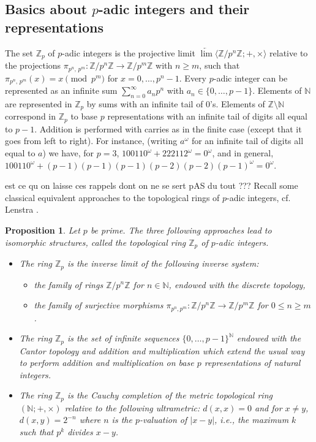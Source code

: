 \documentclass[11pt,a4paper]{article}
\newtheorem{proposition}[theorem]{Proposition}
\theoremstyle{definition} %
\newcommand\+[1]{\mathcal{#1}} %
\newcommand{\N}{{\mathbb N}}     %
\newcommand{\Z}{{\mathbb Z}}     %
\newcommand{\pat}{\color{red}}
\begin{document}
\subsection{ Basics about $p$-adic integers and their representations}\label{ss p-adicBasics}
The set $\Z_p$ of $p$-adic integers  is the projective limit 
${\underleftarrow{\lim}} \langle\Z/p^n\Z;+,\times\rangle$
relative to the projections $\pi_{p^n\!,\,p^m}\colon \Z/p^n\Z\to\Z/p^m\Z$ 
 with $n\geq m$, such that $\pi_{p^n\!,\,p^m}(x)=x\pmod {p^m}$ for 
$x=0,\ldots,p^n-1$. 
 Every $p$-adic integer  can be represented as an infinite sum
 $\sum_{n=0}^\infty a_n p^n$ with $a_n\in\{0,\ldots,p-1\}$. 
 Elements of $\N$ are represented in $\Z_p$ 
 by sums with an infinite tail of $0$'s.
Elements of $\Z\setminus\N$ correspond in $\Z_p$ to  base $p$
representations with an infinite tail of digits all equal to $p-1$.
 Addition is performed with carries as in the finite case (except that it goes from left to right).
 For instance, (writing $a^\omega$ for an infinite tail of digits all equal to $a$)
we have, for $p=3$,  $100110^\omega + 222112^\omega=0^\omega$, and in general, $100110^\omega + (p-1)(p-1)(p-1)(p-2)(p-2)(p-1)^\omega=0^\omega$.

{\pat est ce qu on laisse ces rappels dont on ne se sert pAS du tout ???
Recall some classical equivalent approaches to
the topological rings of $p$-adic integers,
cf.\! Lenstra \cite{lenstra2}. %
%

\begin{proposition}\label{p:Zp}
Let $p$ be prime.
The three following approaches lead to isomorphic structures,
called the topological ring $\Z_p$ of $p$-adic integers.
\begin{itemize}
\item
The ring $\Z_p$ is the inverse limit of the following inverse system:
\itemsep0pt\begin{itemize}
\item
the family of rings $\Z/p^n\Z$ for $n\in\N$,
endowed with the discrete topology,
\item
the family of surjective morphisms
$\pi_{p^n,p^m}:\Z/p^n\Z \to \Z/p^m\Z$ for $0{\leq} n\geq m$.
\end{itemize}
\item
The ring $\Z_p$ is the set of infinite sequences $\{0,\ldots,p-1\}^\N$
endowed with the Cantor topology and addition and multiplication
which extend the usual way to perform addition and multiplication
on base $p$ representations of natural integers.
\item
The ring $\Z_p$ is the Cauchy completion of the metric topological ring
$(\N;+,\times)$
relative to the following ultrametric: 
$d(x,x)=0$ and for $x\neq y$, $d(x,y)=2^{-n}$ where $n$ is the $p$-valuation of $|x-y|$,
i.e., the maximum $k$ such that $p^k$ divides $x-y$.
\end{itemize}
\end{proposition}
%
}
\fi
\end{document}
